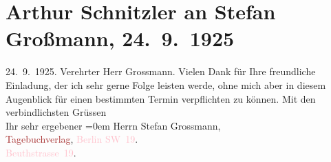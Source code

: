 

               \section[Arthur Schnitzler an Stefan Großmann, 24. 9. 1925]{ Arthur Schnitzler an Stefan Großmann, 24. 9. 1925}\nopagebreak{}\rehead{ }\normalsize\beginnumbering{} \toendnotes[C]{\smallbreak\pagebreak[2]} 
\pstart
           \raggedleft{}{\pb}24. 9. 1925. \pend
           \pstart{}Verehrter Herr Grossmann.\pend\pstart
           Vielen Dank für Ihre freundliche Einladung, der ich sehr gerne Folge leisten
                    werde, ohne mich aber in diesem Augenblick für einen bestimmten Termin
                    verpflichten zu können.\pend
           \pstart
           Mit den verbindlichsten Grüssen{\\[\baselineskip]}Ihr sehr ergebener\pend
           \leftskip=0em{}{\bigskip}\pstart
           \noindent{}Herrn Stefan Grossmann,{\\}\textcolor{brown}{Tagebuchverlag}{}\ledrightnote{\textcolor{brown}{Das Tage-Buch}}, \textcolor{pink}{Berlin SW 19}{}\ledrightnote{\textcolor{pink}{Berlin}}.{\\}\textcolor{pink}{Beuthstrasse 19}{}\ledrightnote{\textcolor{pink}{Beuthstrasse}}.\pend
           \endnumbering{}  
      